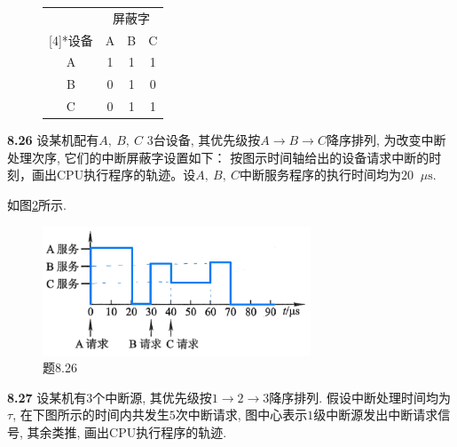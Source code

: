 \documentclass[UTF8]{report}
\newcommand{\mrm}[1]{\mathrm{#1}}
\newcommand{\problem}[1]{{\setlength{\parskip}{10pt}\noindent \bf{#1}}}
\newenvironment{solution}{{\noindent\hskip 2em \bf 解 \quad}}{}
\begin{document}
\begin{figure}
\begin{minipage}[b]{.5\linewidth}
\begin{tabular}{|c|c|c|c|}
            \rowcolor[rgb]{ .894,  .875,  .925}  & \multicolumn{3}{c|}{屏蔽字} \bigstrut\\
            \cline{2-4}    \rowcolor[rgb]{ .894,  .875,  .925} \multirow{-1.5}[4]{*}{设备}  & A & B & C \bigstrut\\
            \hline
            \rowcolor[rgb]{ .773,  .851,  .945} A & \cellcolor[rgb]{ .855,  .933,  .953}1 & \cellcolor[rgb]{ .855,  .933,  .953}1 & \cellcolor[rgb]{ .855,  .933,  .953}1 \bigstrut\\
            \hline
            \rowcolor[rgb]{ .773,  .851,  .945} B & \cellcolor[rgb]{ .922,  .945,  .871}0 & \cellcolor[rgb]{ .855,  .933,  .953}1 & \cellcolor[rgb]{ .922,  .945,  .871}0 \bigstrut\\
            \hline
            \rowcolor[rgb]{ .773,  .851,  .945} C & \cellcolor[rgb]{ .922,  .945,  .871}0 & \cellcolor[rgb]{ .855,  .933,  .953}1 & \cellcolor[rgb]{ .855,  .933,  .953}1 \bigstrut\\
            \hline
        \end{tabular}%
        \label{tab:8_26}%
    \end{minipage}
\end{figure}

    

\problem{8.26} 设某机配有$A,\ B,\ C$ 3台设备, 其优先级按$A \to B \to C$降序排列, 为改变中断处理次序, 它们的中断屏蔽字设置如下：
按图示时间轴给出的设备请求中断的时刻，画出CPU执行程序的轨迹。设$A,\ B,\ C$中断服务程序的执行时间均为$20 \mathop{}\!\mu \mrm s$. 


\begin{solution}
    如图\ref{fig:8_26}所示. 
    \begin{figure}[htbp]
        \centering
        \includegraphics[width=8cm]{fig/8.26.png}
        \caption{题8.26}
        \label{fig:8_26}
    \end{figure}
\end{solution}
    

\problem{8.27} 设某机有$3$个中断源, 其优先级按$1 \to 2 \to 3$降序排列. 假设中断处理时间均为$\tau$, 在下图所示的时间内共发生$5$次中断请求, 图中心表示$1$级中断源发出中断请求信号, 其余类推, 画出CPU执行程序的轨迹.
\end{document}
